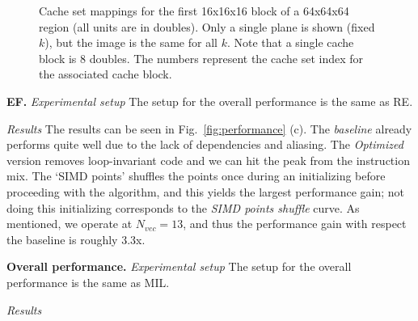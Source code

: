 \documentclass[letterpaper]{article}
\newcommand{\mypar}[1]{{\bf #1.}}
\newcommand\inputpgf[2]{{
\let\pgfimageWithoutPath\pgfimage
\renewcommand{\pgfimage}[2][]{\pgfimageWithoutPath[##1]{#1/##2}}

}}
\begin{document}
\begin{figure}[t]
  \centering
  \scalebox{0.9}{%
  }
  \caption{Cache set mappings for the first 16x16x16 block of a 64x64x64 region (all units are in doubles). Only a single plane is shown (fixed $k$), but the image is the same for all $k$. Note that a single cache block is 8 doubles. The numbers represent the cache set index for the associated cache block.}
  \label{res:conflict_miss_64}
\end{figure}

\mypar{EF} \textit{Experimental setup} The setup for the overall performance is the same as RE.

\textit{Results}
 The results can be seen in Fig.~\ref{fig:performance} (c). The \textit{baseline} already performs quite well due to the lack of dependencies and aliasing. The \textit{Optimized} version removes loop-invariant code and we can hit the peak from the instruction mix. The `SIMD points' shuffles the points once during an initializing before proceeding with the algorithm, and this yields the largest performance gain; not doing this initializing corresponds to the \textit{SIMD points shuffle} curve. As mentioned, we operate at $N_{vec}=13$, and thus the performance gain with respect the baseline is roughly 3.3x. 


\mypar{Overall performance} \textit{Experimental setup} The setup for the overall performance is the same as MIL.

\textit{Results}
\end{document}
